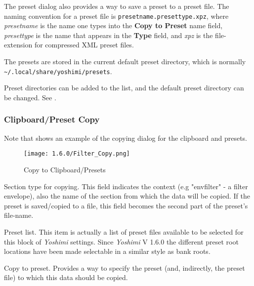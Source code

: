    The preset dialog also provides a way
   to save a preset to a preset file.
   The naming convention for a preset file is
   \texttt{presetname.presettype.xpz}, where
   \textsl{presetname} is the name one types into the \textbf{Copy to Preset}
   name field, \textsl{presettype} is the name that appears in the
   \textbf{Type} field, and \textsl{xpz} is the file-extension for compressed
   XML preset files.

   The presets are stored in the current default preset directory,
   which is normally\\
   \texttt{\textasciitilde/.local/share/yoshimi/presets}.

   Preset directories can be added to the list, and
   the default preset directory can be changed.
   See .

\subsubsection{Clipboard/Preset Copy}
\label{subsubsec:clipboard_copy}

   Note that \hspace {6 pt}shows an example of the copying
   dialog for the clipboard and presets.

\begin{figure}[H]
   \centering
   \texttt{[image: 1.6.0/Filter\_Copy.png]}
   \caption[Copy to Clipboard/Presets]{Copy to Clipboard/Presets}
   \label{fig:copy_to_clipboard/presets}
\end{figure}

   \setcounter{ItemCounter}{0}      %

   Section type for copying.
   This field indicates the context (e.g "envfilter" - a filter envelope), also the
   name of the section from which the data will be copied.
   If the preset is saved/copied to a file, this field becomes the second part of
   the preset's file-name.

   Preset list.
   This item is actually a list of preset files available to be selected for
   this block of \textsl{Yoshimi} settings. Since \textsl{Yoshimi} V 1.6.0 the
   different preset root locations have been made selectable in a similar style
   as bank roots.

   Copy to preset.
   Provides a way to specify the preset (and, indirectly, the preset file)
   to which this data should be copied.

